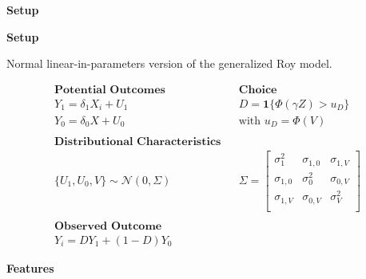 \begin{frame}\begin{center}
\LARGE\textbf{Setup}
\end{center}\end{frame}



\begin{frame}
\textbf{Setup}

\medskip

Normal linear-in-parameters version of the generalized Roy model.

	\begin{align*}
	&\textbf{Potential Outcomes} & & \textbf{Choice}  &\\
	& Y_1 = \delta_1 X_i + U_{1} &  &D = \mathbf{1}\{\Phi(\gamma Z) > u_D\} &\\
	& Y_0 = \delta_0 X + U_{0} &  & \text{with $u_D = \Phi(V)$}  &\\
	&&&&\\
	&\textbf{Distributional Characteristics}&&&\\
	&\{U_{1}, U_{0}, V\} \sim \mathcal{N}\left(0, \Sigma\right)&&\Sigma =  \begin{bmatrix}
	\sigma_1^{2} & \sigma_{1,0} & \sigma_{1,V} \\
	\sigma_{1,0} & \sigma_0^{2} & \sigma_{0,V} \\
	\sigma_{1,V} & \sigma_{0,V} & \sigma_V^{2} \\
	\end{bmatrix}&\\
	&&&&\\
	& \textbf{Observed Outcome} &&&\\
	& Y_i = DY_1 + (1-D) Y_0 &&&
	\end{align*}
\end{frame}

\begin{frame}\begin{center}
\LARGE\textbf{Features}
\end{center}\end{frame}

